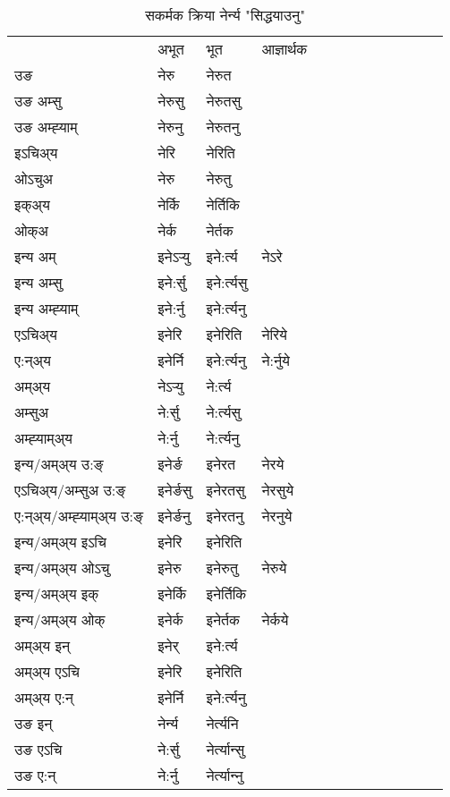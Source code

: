 \begin{table}[H]
\label{er.vt} \centering
\caption{सकर्मक क्रिया  नेर्न्य  "सिद्धयाउनु"  }
\begin{tabular}{l|l|l|l|l|l|l|l|l|l|l|l|l}  \toprule
&अभूत & भूत & आज्ञार्थक \\ 
उङ &नेरु &नेरुत \\ 
उङ अम्सु &नेरुसु &नेरुतसु \\ 
उङ अम्ह्‍याम् &नेरुनु &नेरुतनु \\ 
इऽचिअ्य &नेरि &नेरिति   \\ 
ओऽचुअ &नेरु &नेरुतु   \\ 
इक्अ्य &नेर्कि &नेर्तिकि   \\ 
ओक्अ &नेर्क &नेर्तक   \\ 
इन्य अम् & इनेऽर्‍यु  & इने:र्त्य &नेऽरे  \\ 
इन्य अम्सु & इने:र्सु  & इने:र्त्यसु   \\ 
इन्य अम्ह्‍याम् & इने:र्नु  & इने:र्त्यनु   \\ 
एऽचिअ्य & इनेरि & इनेरिति &नेरिये    \\ 
ए:न्अ्य & इनेर्नि  & इने:र्त्यनु &ने:र्नुये  \\ 
अम्अ्य & नेऽर्‍यु  & ने:र्त्य  \\ 
अम्सुअ & ने:र्सु & ने:र्त्यसु  \\ 
अम्ह्‍याम्अ्य & ने:र्नु  & ने:र्त्यनु \\ 
\midrule
इन्य/अम्अ्य उ:ङ्‌&इनेर्ङ & इनेरत &नेरये \\ 
एऽचिअ्य/अम्सुअ उ:ङ्‌ &इनेर्ङसु & इनेरतसु &नेरसुये \\ 
ए:न्अ्य/अम्ह्‍याम्अ्य उ:ङ्‌ &इनेर्ङनु & इनेरतनु &नेरनुये \\ 
इन्य/अम्अ्य इऽचि & इनेरि & इनेरिति    \\ 
इन्य/अम्अ्य ओऽचु & इनेरु & इनेरुतु  &नेरुये  \\ 
इन्य/अम्अ्य इक् & इनेर्कि & इनेर्तिकि   \\ 
इन्य/अम्अ्य ओक् & इनेर्क & इनेर्तक  &नेर्कये  \\ 
अम्अ्य इन् & इनेर् & इने:र्त्य   \\ 
अम्अ्य एऽचि & इनेरि & इनेरिति    \\ 
अम्अ्य ए:न् & इनेर्नि  & इने:र्त्यनु  \\ 
\midrule
उङ इन् & नेर्न्य  & नेर्त्यनि  \\ 
उङ एऽचि & ने:र्सु  & नेर्त्यान्सु   \\ 
उङ ए:न्& ने:र्नु  & नेर्त्यान्‍नु   \\ 
\bottomrule
\end{tabular}
\end{table}


